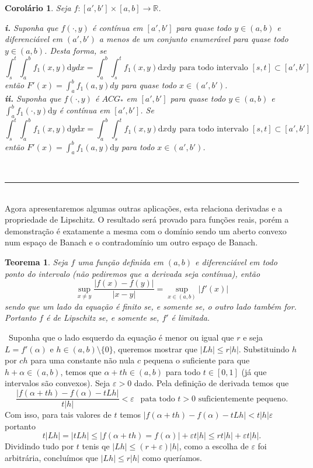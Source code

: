 \documentclass[12pt, a4paper]{article}
\newtheorem{thrm}[mydef]{Teorema}
\newtheorem{cor}[mydef]{Corolário}
\def\dem{\par\smallbreak\noindent {\textit{ Demonstração:}} \ }
\def\eop{\hfill\rule{2.5mm}{2.5mm}}
\theoremstyle{definition}
\begin{document}
\begin{cor}
	
	Seja $f:[a',b']\times [a,b]\rightarrow \mathbb{R}$. 
	
	\textbf{i.} Suponha que $f(\cdot, y)$ é contínua em $[a',b']$ para quase todo $y\in (a,b)$ e diferenciável em $(a',b')$ a menos de um conjunto enumerável para quase todo $y\in (a,b)$. Desta forma, se $$\int_s^t\int_a^b f_1(x,y) \text{d}y dx=\int_a^b\int_s^t f_1(x,y) \text{d}x  \text{d}y \ \ \text{para todo intervalo }[s,t]\subset [a',b']$$ então $F'(x)=\int_a^b f_1(a,y)dy$ para quase todo $x\in (a',b')$. \\
	
	\textbf{ii.} Suponha que $f(\cdot, y)$ é $ACG_*$ em $[a',b']$ para quase todo $y\in (a,b)$ e $\int_a^b f_1(\cdot , y) \text{d}y$ é contínua em $[a',b']$. Se $$\int_s^t\int_a^b f_1(x,y) \text{d}y  \text{d}x=\int_a^b\int_s^t f_1(x,y) \text{d}x  \text{d}y \ \ \text{para todo intervalo }[s,t]\subset [a',b']$$ então $F'(x)=\int_a^b f_1(a,y) \text{d}y$ para todo $x\in (a',b')$.
	
\end{cor}
\ \eop \\

Agora apresentaremos algumas outras aplicações, esta relaciona derivadas e a propriedade de Lipschitz. O resultado será provado para funções reais, porém a demonstração é exatamente a mesma com o domínio sendo um aberto convexo num espaço de Banach e o contradomínio um outro espaço de Banach. 

\begin{thrm}
	
	Seja $f$ uma função definida em $(a,b)$ e diferenciável em todo ponto do intervalo (não pediremos que a derivada seja contínua), então $$\sup_{x\neq y} \frac{|f(x)-f(y)|}{|x-y|} = \sup_{x\in (a,b)} |f'(x)|$$ sendo que um lado da equação é finito se, e somente se, o outro lado também for. Portanto $f$ é de Lipschitz se, e somente se, $f'$ é limitada. 
	
\end{thrm}   

\dem Suponha que o lado esquerdo da equação é menor ou igual que $r$ e seja $L=f'(\alpha)$ e $h\in (a,b)\setminus \{0\}$, queremos mostrar que $|Lh|\leq r |h|$. Substituindo $h$ por $ch$ para uma constante não nula $c$ pequena o suficiente para que $h+\alpha \in (a,b)$, temos que $\alpha + th \in (a,b)$ para todo $t\in [0,1]$ (já que intervalos são convexos). Seja $\varepsilon > 0$ dado. Pela definição de derivada temos que $$\frac{|f(\alpha +th)-f(\alpha)-tLh|}{t|h|} < \varepsilon \ \ \text{ pata todo } t>0 \text{ suficientemente pequeno.}$$ Com isso, para tais valores de $t$ temos $|f(\alpha +th)-f(\alpha)-tLh|< t|h| \varepsilon$ portanto $$t|Lh|=|tLh|\leq |f(\alpha +th)=f(\alpha)|+\varepsilon t |h| \leq rt|h|+\varepsilon t|h|.$$ Dividindo tudo por $t$ tenis qe $|Lh|\leq (r+\varepsilon )|h|$, como a escolha de $\varepsilon$ foi arbitrária, concluímos que $|Lh| \leq r|h|$ como queríamos. 
\end{document}
